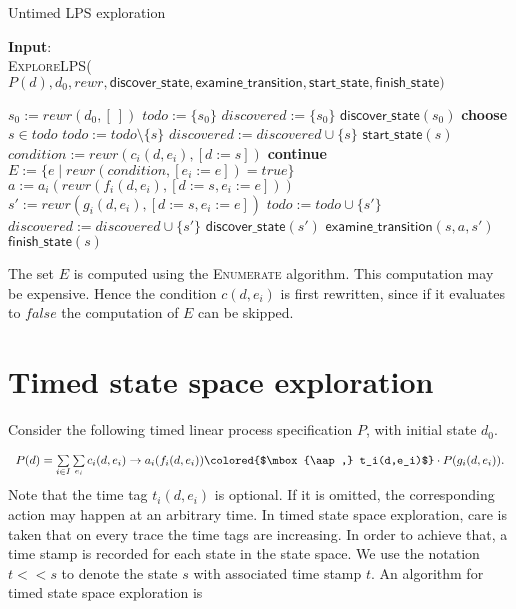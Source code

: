 \documentclass{article}
\newcommand{\at}[1]{\mbox{\aap ,} #1}
\newcommand{\aftertime}{\ensuremath{<\!\!<}}
\begin{document}
\begin{algorithm}
\small
\caption{Untimed LPS exploration}
\vspace*{1ex}
{\textbf{Input}:} \\
\textsc{ExploreLPS}($P(d), d_0, rewr, \textsf{discover\_state}, \textsf{examine\_transition}, \textsf{start\_state}, \textsf{finish\_state})$
\begin{algorithmic}[1]
\State $s_0 := rewr(d_0, [\:])$
\State $todo := \{ s_0 \}$
\State $discovered := \{ s_0 \}$
\State $\textsf{discover\_state}(s_0)$
  \State \textbf{choose} $s \in todo$
  \State $todo := todo \setminus \{s\}$
  \State $discovered := discovered \cup \{s\}$
  \State $\textsf{start\_state}(s)$
    \State $condition := rewr(c_i(d, e_i), [d := s])$
      \State \textbf{continue}
    \EndIf
    \State $E := \{ e \mid rewr(condition, [e_i := e]) = true \}$
      \State $a := a_i(rewr(f_i(d,e_i), [d:=s,e_i:=e]))$
      \State $s' := rewr(g_i(d,e_i), [d:=s,e_i:=e])$
        \State $todo := todo \cup \{ s' \}$
        \State $discovered := discovered \cup \{s'\}$
        \State $\textsf{discover\_state}(s')$
      \EndIf
      \State $\textsf{examine\_transition}(s, a, s')$
    \EndFor
  \EndFor
  \State $\textsf{finish\_state}(s)$
\EndWhile
\end{algorithmic}
\end{algorithm}

The set $E$ is computed using the \textsc{Enumerate} algorithm. This computation may be expensive. Hence the condition $c(d,e_i)$ is first rewritten, since if it evaluates to $false$ the computation of $E$ can be skipped.

\newpage
\section{Timed state space exploration}
Consider the following timed linear process specification $P$, with initial state $d_0$.

\[
\begin{array}{l}
P(d)=
\sum\limits_{i\in I}\sum\limits_{e_i}c_i(d, e_i)\rightarrow a_i(f_i(d,e_i))
\colored{$\at t_i(d,e_i)$}
\cdot P(g_i(d,e_i)).
\end{array}
\]
Note that the time tag $t_i(d,e_i)$ is optional. If it is omitted, the corresponding action may happen at an arbitrary time. In timed state space exploration, care is taken that on every trace the time tags are
increasing. In order to achieve that, a time stamp is recorded for each state
in the state space. We use the notation $t \aftertime s$ to denote the state $s$
with associated time stamp $t$.
An algorithm for timed state space exploration is
\end{document}
